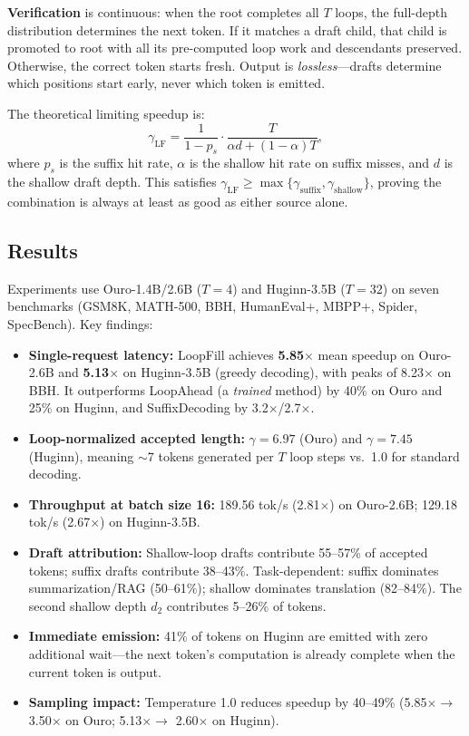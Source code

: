 \documentclass[11pt,a4paper]{article}
\begin{document}
\textbf{Verification} is continuous: when the root completes all $T$ loops, the full-depth distribution determines the next token. If it matches a draft child, that child is promoted to root with all its pre-computed loop work and descendants preserved. Otherwise, the correct token starts fresh. Output is \emph{lossless}---drafts determine which positions start early, never which token is emitted.

The theoretical limiting speedup is:
\[
  \gamma_{\mathrm{LF}} = \frac{1}{1 - p_s} \cdot \frac{T}{\alpha d + (1-\alpha)T},
\]
where $p_s$ is the suffix hit rate, $\alpha$ is the shallow hit rate on suffix misses, and $d$ is the shallow draft depth. This satisfies $\gamma_{\mathrm{LF}} \geq \max\{\gamma_{\mathrm{suffix}}, \gamma_{\mathrm{shallow}}\}$, proving the combination is always at least as good as either source alone.

\subsection{Results}
Experiments use Ouro-1.4B/2.6B ($T{=}4$) and Huginn-3.5B ($T{=}32$) on seven benchmarks (GSM8K, MATH-500, BBH, HumanEval+, MBPP+, Spider, SpecBench). Key findings:

\begin{itemize}
  \item \textbf{Single-request latency:} LoopFill achieves \textbf{5.85$\times$} mean speedup on Ouro-2.6B and \textbf{5.13$\times$} on Huginn-3.5B (greedy decoding), with peaks of 8.23$\times$ on BBH. It outperforms LoopAhead (a \emph{trained} method) by 40\% on Ouro and 25\% on Huginn, and SuffixDecoding by 3.2$\times$/2.7$\times$.
  \item \textbf{Loop-normalized accepted length:} $\gamma = 6.97$ (Ouro) and $\gamma = 7.45$ (Huginn), meaning $\sim$7 tokens generated per $T$ loop steps vs.\ 1.0 for standard decoding.
  \item \textbf{Throughput at batch size 16:} 189.56 tok/s (2.81$\times$) on Ouro-2.6B; 129.18 tok/s (2.67$\times$) on Huginn-3.5B.
  \item \textbf{Draft attribution:} Shallow-loop drafts contribute 55--57\% of accepted tokens; suffix drafts contribute 38--43\%. Task-dependent: suffix dominates summarization/RAG (50--61\%); shallow dominates translation (82--84\%). The second shallow depth $d_2$ contributes 5--26\% of tokens.
  \item \textbf{Immediate emission:} 41\% of tokens on Huginn are emitted with zero additional wait---the next token's computation is already complete when the current token is output.
  \item \textbf{Sampling impact:} Temperature 1.0 reduces speedup by 40--49\% (5.85$\times \to$ 3.50$\times$ on Ouro; 5.13$\times \to$ 2.60$\times$ on Huginn).
\end{itemize}
\end{document}
